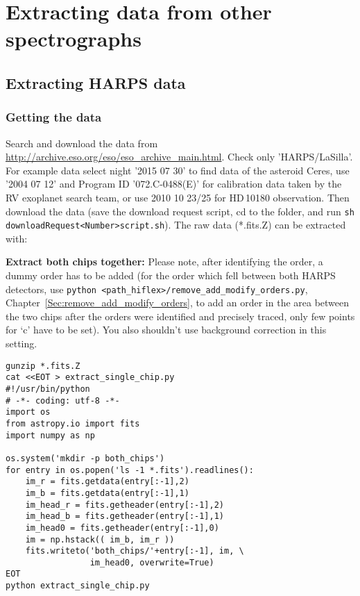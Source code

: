 \documentclass[10pt,a4paper]{article}
\begin{document}


\newpage
\section{Extracting data from other spectrographs}

\subsection{Extracting HARPS data}

\subsubsection{Getting the data}
Search and download the data from \url{http://archive.eso.org/eso/eso_archive_main.html}. Check only 'HARPS/LaSilla'. For example data select night '2015 07 30' to find data of the asteroid Ceres, use '2004 07 12' and Program ID '072.C-0488(E)' for calibration data taken by the RV exoplanet search team, or use 2010 10 23/25 for HD\,10180 observation. Then download the data (save the download request script, cd to the folder, and run \verb|sh  downloadRequest<Number>script.sh|). The raw data (*.fits.Z) can be extracted with:

\textbf{Extract both chips together:} Please note, after identifying the order, a dummy order has to be added (for the order which fell between both HARPS detectors, use \verb|python <path_hiflex>/remove_add_modify_orders.py|, Chapter~\ref{Sec:remove_add_modify_orders}, to add an order in the area between the two chips after the orders were identified and precisely traced, only few points for `c' have to be set). You also shouldn't use background correction in this setting.
\begin{lstlisting}[style=base]
gunzip *.fits.Z
cat <<EOT > extract_single_chip.py
#!/usr/bin/python
# -*- coding: utf-8 -*-
import os
from astropy.io import fits
import numpy as np

os.system('mkdir -p both_chips')
for entry in os.popen('ls -1 *.fits').readlines():
    im_r = fits.getdata(entry[:-1],2)
    im_b = fits.getdata(entry[:-1],1)
    im_head_r = fits.getheader(entry[:-1],2)
    im_head_b = fits.getheader(entry[:-1],1)
    im_head0 = fits.getheader(entry[:-1],0)
    im = np.hstack(( im_b, im_r ))
    fits.writeto('both_chips/'+entry[:-1], im, \
                 im_head0, overwrite=True)
EOT
python extract_single_chip.py
\end{lstlisting}
\end{document}
